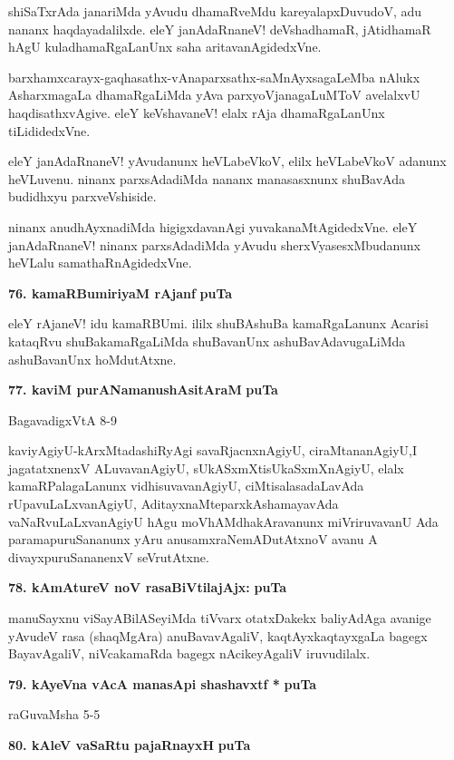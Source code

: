 shiSaTxrAda janariMda yAvudu dhamaRveMdu kareyalapxDuvudoV, adu nananx haqdayadalilxde. eleY janAdaRnaneV! deVshadhamaR, jAtidhamaR hAgU kuladhamaRgaLanUnx saha aritavanAgidedxVne.

barxhamxcarayx-gaqhasathx-vAnaparxsathx-saMnAyxsagaLeMba nAlukx AsharxmagaLa dhamaRgaLiMda yAva parxyoVjana\-gaLuMToV avelalxvU haqdisathxvAgive. eleY keVshavaneV! elalx rAja dhamaRgaLanUnx tiLididedxVne.

eleY janAdaRnaneV! yAvudanunx heVLabeVkoV, elilx heVLabeVkoV adanunx heVLuvenu. ninanx parxsAda\-diMda nananx manasasxnunx shuBavAda budidhxyu parxveVshiside.

\eject

ninanx anudhAyxnadiMda higigxdavanAgi yuvakanaMtAgidedxVne. eleY janA\-daRnaneV! ninanx parxsAdadiMda yAvudu sherxVyasesxMbudanunx heVLalu samathaRnAgidedxVne.

\medskip
\noindent
\textbf{76. kamaRBumiriyaM rAjanf} \hfill{\bf puTa \pageref{90}}

\smallskip
eleY rAjaneV! idu kamaRBUmi. ililx shuBAshuBa kamaRgaLanunx Acarisi kataqRvu shuBakamaR\-gaLiMda shuBavanUnx ashuBavAdavugaLiMda ashuBavanUnx hoMdutAtxne.

\medskip
\noindent
\textbf{77. kaviM purANamanushAsitAraM} \hfill{\bf puTa \pageref{239}}

\hfill{BagavadigxVtA 8-9}

\smallskip
kaviyAgiyU-kArxMtadashiRyAgi savaRjacnxnAgiyU, ciraMtananAgiyU,\break I jagatatxnenxV ALuvava\-nAgiyU, sUkASxmXtisUkaSxmXnAgiyU, elalx kamaRPala\-gaLanunx vidhisuvavanAgiyU, ciMtisalasadaLavAda rUpavuLaLxvanAgiyU, AditayxnaMte\break parxkAshamayavAda vaNaRvuLaLxvanAgiyU hAgu moVhAMdhakAra\-vanunx miVriru\-vavanU Ada paramapuruSananunx yAru anusamxraNemADutAtxnoV avanu A divayxpuruSa\-nanenxV seVrutAtxne.


\medskip
\noindent
\textbf{78. kAmAtureV noV rasaBiVtilajAjx:} \hfill{\bf puTa \pageref{222}}

\smallskip
manuSayxnu viSayABilASeyiMda tiVvarx otatxDakekx baliyAdAga avanige yAvudeV rasa (shaqMgAra) anuBavavAgaliV, kaqtAyxkaqtayxgaLa bagegx BayavAgaliV, niVcakamaRda bagegx nAcikeyAgaliV iruvudilalx.


\smallskip
\noindent
\textbf{79. kAyeVna vAcA manasApi shashavxtf *} \hfill{\bf puTa \pageref{56}}

\hfill{raGuvaMsha 5-5}

\medskip
\noindent
\textbf{80. kAleV vaSaRtu pajaRnayxH} \hfill{\bf puTa \pageref{63}}


